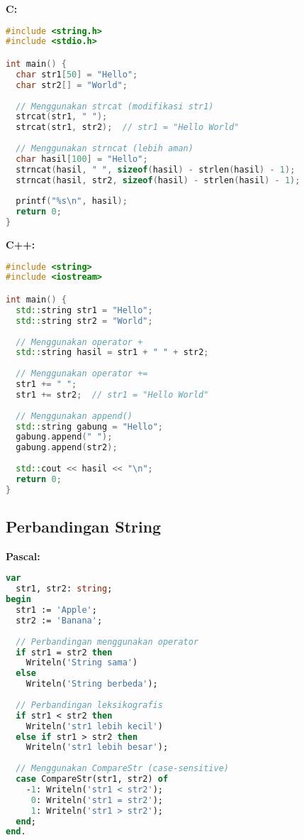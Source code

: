 \documentclass[../main.tex]{subfiles}
\begin{document}
\textbf{C:}
\begin{lstlisting}[language=C, caption={Konkatenasi di C}]
#include <string.h>
#include <stdio.h>

int main() {
  char str1[50] = "Hello";
  char str2[] = "World";
  
  // Menggunakan strcat (modifikasi str1)
  strcat(str1, " ");
  strcat(str1, str2);  // str1 = "Hello World"
  
  // Menggunakan strncat (lebih aman)
  char hasil[100] = "Hello";
  strncat(hasil, " ", sizeof(hasil) - strlen(hasil) - 1);
  strncat(hasil, str2, sizeof(hasil) - strlen(hasil) - 1);
  
  printf("%s\n", hasil);
  return 0;
}
\end{lstlisting}

\textbf{C++:}
\begin{lstlisting}[language=C++, caption={Konkatenasi di C++}]
#include <string>
#include <iostream>

int main() {
  std::string str1 = "Hello";
  std::string str2 = "World";
  
  // Menggunakan operator +
  std::string hasil = str1 + " " + str2;
  
  // Menggunakan operator +=
  str1 += " ";
  str1 += str2;  // str1 = "Hello World"
  
  // Menggunakan append()
  std::string gabung = "Hello";
  gabung.append(" ");
  gabung.append(str2);
  
  std::cout << hasil << "\n";
  return 0;
}
\end{lstlisting}

\subsection{Perbandingan String}

\textbf{Pascal:}
\begin{lstlisting}[language=Pascal, caption={Perbandingan di Pascal}]
var
  str1, str2: string;
begin
  str1 := 'Apple';
  str2 := 'Banana';
  
  // Perbandingan menggunakan operator
  if str1 = str2 then
    Writeln('String sama')
  else
    Writeln('String berbeda');
  
  // Perbandingan leksikografis
  if str1 < str2 then
    Writeln('str1 lebih kecil')
  else if str1 > str2 then
    Writeln('str1 lebih besar');
  
  // Menggunakan CompareStr (case-sensitive)
  case CompareStr(str1, str2) of
    -1: Writeln('str1 < str2');
     0: Writeln('str1 = str2');
     1: Writeln('str1 > str2');
  end;
end.
\end{lstlisting}
\end{document}
